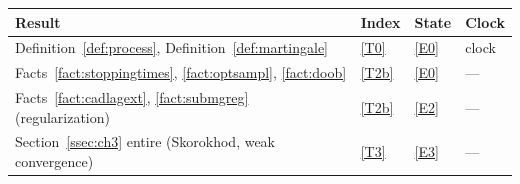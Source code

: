 \documentclass[11pt,a4paper]{article}
\theoremstyle{plain}
\theoremstyle{definition}
\theoremstyle{remark}
\begin{document}
\medskip
\noindent
\begin{tabular}{@{}p{}p{}p{}p{}@{}}
\toprule
\textbf{Result} & \textbf{Index} & \textbf{State} & \textbf{Clock} \\
\midrule
Definition~\ref{def:process}, Definition~\ref{def:martingale}
  & \eqref{T0} & \eqref{E0} & clock \\
Facts~\ref{fact:stoppingtimes}, \ref{fact:optsampl}, \ref{fact:doob}
  & \eqref{T2b} & \eqref{E0} & --- \\
Facts~\ref{fact:cadlagext}, \ref{fact:submgreg} (regularization)
  & \eqref{T2b} & \eqref{E2} & --- \\
Section~\ref{ssec:ch3} entire (Skorokhod, weak convergence)
  & \eqref{T3} & \eqref{E3} & --- \\
\bottomrule
\end{tabular}
\end{document}
